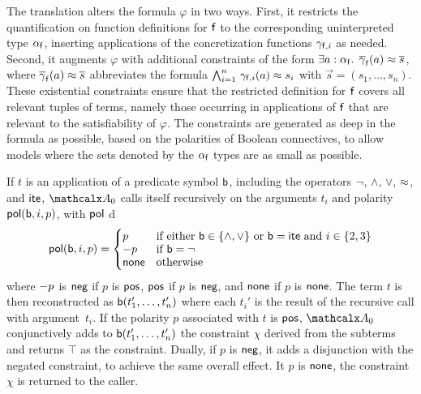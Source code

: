 
The translation alters the formula $\varphi$ in two ways. First, it restricts the
quantification on function definitions for $\mathsf{f}$ to the corresponding
uninterpreted type $\alpha_{\mathsf{f}}$, inserting applications of the concretization functions $\gamma_{\mathsf{f},i}$ as needed.
Second, it augments $\varphi$ with additional constraints of the form
$\exists a :\nobreak \alpha_{\mathsf{f}}.\;\, \overline{\gamma}_{\mathsf{f}}( a ) \approx \overline{s}$,
where $\overline{\gamma}_{\mathsf{f}}( a ) \approx \overline{s}$ abbreviates the formula
$\bigwedge_{i=1}^n\, \gamma_{\mathsf{f},i}(a) \approx s_i$
with $\vec s = (s_1,\dotsc,s_n)$.
These existential %
constraints
ensure that the restricted definition for $\mathsf{f}$ covers all relevant tuples
of terms, namely those occurring in applications of $\mathsf{f}$
that are relevant to the satisfiability of $\varphi$. The constraints are
generated as deep in the formula as possible, based on the
polarities of Boolean connectives, to allow models where the sets
denoted by the $\alpha_{\mathsf{f}}$ types are as small as possible.

If $t$ is an application of a predicate symbol $\mathsf{b}$, including the
operators ${\oldneg}$, ${\wedge}$, ${\vee}$, ${\approx}$, and ${\mathsf{ite}}$,
$\conv_0$ calls itself recursively on the arguments $t_i$ and polarity $\mathsf{pol}(
\mathsf{b}, i, p )$, with $\mathsf{pol}$ d
\[\pol( \boolop, i, p ) =
\begin{cases}
p & \text{if either $\boolop \in \{{\wedge}, {\vee}\}$ or $\boolop = \lite$ and $i \in \{2, 3\}$} \\[-\jot]
\pnegate p & \text{if $\boolop = {\neg}$} \\[-\jot]
\pnone & \text{otherwise}
\end{cases}\]
where $- p$ is $\mathsf{neg}$ if $p$ is $\mathsf{pos}$, $\mathsf{pos}$
if $p$ is $\mathsf{neg}$, and $\mathsf{none}$ if $p$ is $\mathsf{none}$.
The term $t$ is then reconstructed as $\mathsf{b}(t_1',\dotsc,t_n')$
where each $t_i'$ is the result of the recursive call with argument~$t_i$.
If the polarity $p$ associated with $t$ is $\mathsf{pos}$,
$\conv_0$ conjunctively adds to $\mathsf{b}(t_1',\dotsc,t_n')$ the constraint $\chi$ derived from
the subterms and returns $\top$ as the constraint.
Dually, if $p$ is $\mathsf{neg}$, it adds a
disjunction with the negated constraint, to achieve the same overall effect.
It $p$ is $\mathsf{none}$, the constraint $\chi$ is
returned to the caller.

